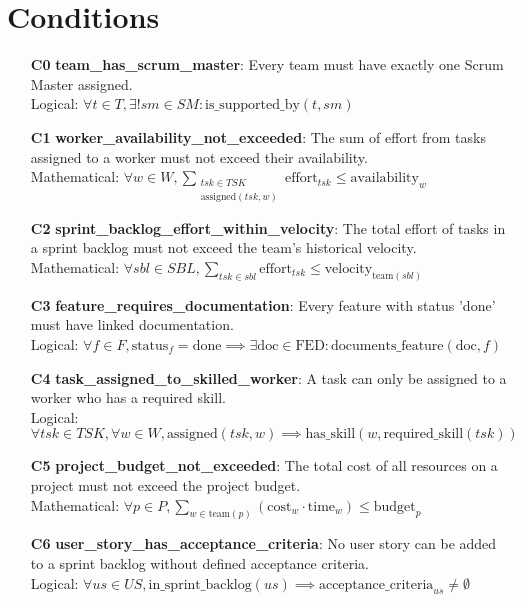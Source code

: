 \documentclass[11pt]{article}
\begin{document}
\section{Conditions}
\begin{itemize}
    \item[\textbf{C0}] \textbf{team\_has\_scrum\_master}: Every team must have exactly one Scrum Master assigned.
    \\ Logical: $\forall t \in T, \exists! sm \in SM : \text{is\_supported\_by}(t, sm)$
    \item[\textbf{C1}] \textbf{worker\_availability\_not\_exceeded}: The sum of effort from tasks assigned to a worker must not exceed their availability.
    \\ Mathematical: $\forall w \in W, \sum_{\substack{tsk \in TSK \\ \text{assigned}(tsk, w)}} \text{effort}_{tsk} \leq \text{availability}_w$
    \item[\textbf{C2}] \textbf{sprint\_backlog\_effort\_within\_velocity}: The total effort of tasks in a sprint backlog must not exceed the team's historical velocity.
    \\ Mathematical: $\forall sbl \in SBL, \sum_{tsk \in sbl} \text{effort}_{tsk} \leq \text{velocity}_{\text{team}(sbl)}$
    \item[\textbf{C3}] \textbf{feature\_requires\_documentation}: Every feature with status 'done' must have linked documentation.
    \\ Logical: $\forall f \in F, \text{status}_f = \text{done} \implies \exists \text{doc} \in \text{FED} : \text{documents\_feature}(\text{doc}, f)$
    \item[\textbf{C4}] \textbf{task\_assigned\_to\_skilled\_worker}: A task can only be assigned to a worker who has a required skill.
    \\ Logical: $\forall tsk \in TSK, \forall w \in W, \text{assigned}(tsk, w) \implies \text{has\_skill}(w, \text{required\_skill}(tsk))$
    \item[\textbf{C5}] \textbf{project\_budget\_not\_exceeded}: The total cost of all resources on a project must not exceed the project budget.
    \\ Mathematical: $\forall p \in P, \sum_{w \in \text{team}(p)} (\text{cost}_w \cdot \text{time}_w) \leq \text{budget}_p$
    \item[\textbf{C6}] \textbf{user\_story\_has\_acceptance\_criteria}: No user story can be added to a sprint backlog without defined acceptance criteria.
    \\ Logical: $\forall us \in US, \text{in\_sprint\_backlog}(us) \implies \text{acceptance\_criteria}_{us} \neq \emptyset$

\end{itemize}
\end{document}
